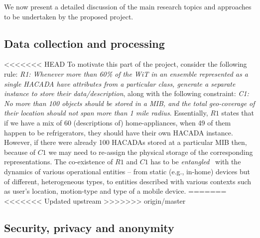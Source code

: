 We now present a detailed discussion of the main research topics and approaches to be undertaken by the proposed project.


\subsection{Data collection and processing}\label{data-cp}

<<<<<<< HEAD
To motivate this part of the project, consider the following rule: {\it R1: Whenever more than 60\% of the WiT in an ensemble represented as a single HACADA have attributes from a particular class, generate a separate instance to store their data/description}, along with the following constraint: {\it C1: No more than 100 objects should be stored in a MIB, and the total geo-coverage of their location should not span more than 1 mile radius}. Essentially, $R1$ states that if we have a mix of 60 (descriptions of) home-appliances, when 49 of them happen to be refrigerators, they should have their own HACADA instance. However, if there were already 100 HACADAs stored at a particular MIB then, because of $C1$ we may need to re-assign the physical storage of the corresponding representations. The co-existence of $R1$ and $C1$ has to be {\it entangled}~\cite{GuptaKRBGK11} with the dynamics of various operational entities -- from static (e.g., in-home) devices but of different, heterogeneous types, to entities described with various contexts such as user's location, motion-type and type of a mobile device.
=======
<<<<<<< Updated upstream
>>>>>>> origin/master





\subsection{Security, privacy and anonymity}



